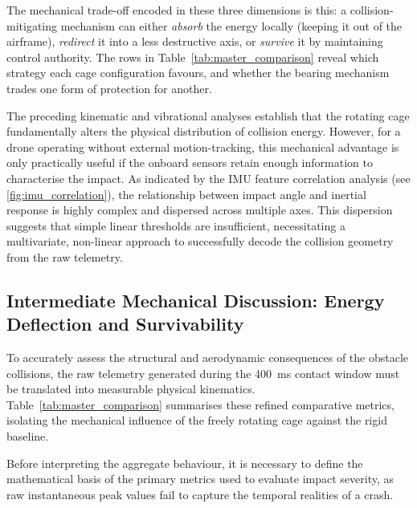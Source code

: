 The mechanical trade-off encoded in these three dimensions is this: a collision-mitigating mechanism can either \emph{absorb} the energy locally (keeping it out of the airframe), \emph{redirect} it into a less destructive axis, or \emph{survive} it by maintaining control authority. The rows in Table~\ref{tab:master_comparison} reveal which strategy each cage configuration favours, and whether the bearing mechanism trades one form of protection for another.

\medskip
The preceding kinematic and vibrational analyses establish that the rotating cage fundamentally alters the physical distribution of collision energy. However, for a drone operating without external motion-tracking, this mechanical advantage is only practically useful if the onboard sensors retain enough information to characterise the impact. As indicated by the IMU feature correlation analysis (see \autoref{fig:imu_correlation}), the relationship between impact angle and inertial response is highly complex and dispersed across multiple axes. This dispersion suggests that simple linear thresholds are insufficient, necessitating a multivariate, non-linear approach to successfully decode the collision geometry from the raw telemetry.

\subsection{Intermediate Mechanical Discussion: Energy Deflection and Survivability}
\label{sec:intermediate_discussion}

To accurately assess the structural and aerodynamic consequences of the obstacle collisions, the raw telemetry generated during the 400~ms contact window must be translated into measurable physical kinematics. Table~\ref{tab:master_comparison} summarises these refined comparative metrics, isolating the mechanical influence of the freely rotating cage against the rigid baseline.

Before interpreting the aggregate behaviour, it is necessary to define the mathematical basis of the primary metrics used to evaluate impact severity, as raw instantaneous peak values fail to capture the temporal realities of a crash.

